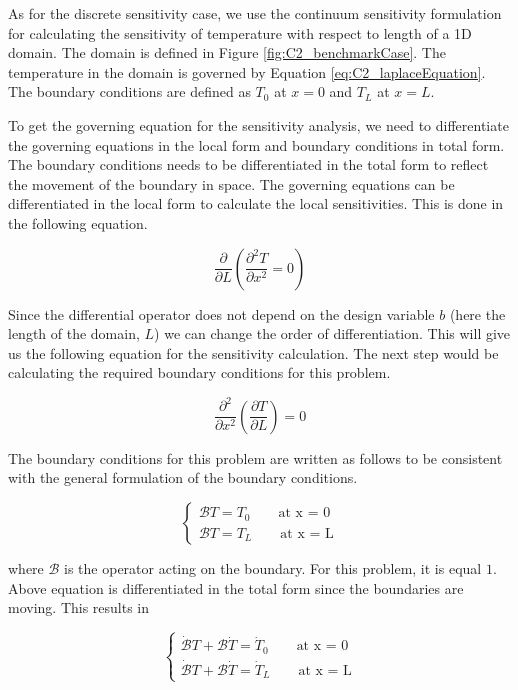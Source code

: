 As for the discrete sensitivity case, we use the continuum sensitivity formulation for calculating the sensitivity of temperature with respect to length of a 1D domain. The domain is defined in Figure \ref{fig:C2_benchmarkCase}. The temperature in the domain is governed by Equation \eqref{eq:C2_laplaceEquation}. The boundary conditions are defined as $T_0$ at $x=0$ and $T_L$ at $x=L$.

To get the governing equation for the sensitivity analysis, we need to differentiate the governing equations in the local form and boundary conditions in total form. The boundary conditions needs to be differentiated in the total form to reflect the movement of the boundary in space. The governing equations can be differentiated in the local form to calculate the local sensitivities. This is done in the following equation.

\begin{equation*}
	\frac{\partial}{\partial L}
	\left( \frac{\partial^2 T}{\partial x^2} = 0 \right)
\end{equation*}

Since the differential operator does not depend on the design variable $b$ (here the length of the domain, $L$) we can change the order of differentiation. This will give us the following equation for the sensitivity calculation. The next step would be calculating the required boundary conditions for this problem.

\begin{equation}\label{eq:C2_laplaceSAequation}
	\frac{\partial^2}{\partial x^2} \left( \frac{\partial T}{\partial L} \right) = 0
\end{equation}

The boundary conditions for this problem are written as follows to be consistent with the general formulation of the boundary conditions. 

\begin{equation*}
\begin{cases}
	\mathcal{B}T = T_0 \qquad \text{at x = 0} \\
	\mathcal{B}T = T_L \qquad \text{at x = L}
\end{cases}
\end{equation*}

where $\mathcal{B}$ is the operator acting on the boundary. For this problem, it is equal $1$. Above equation is differentiated in the total form since the boundaries are moving. This results in

\begin{equation*}
\begin{cases}
	\dot{\mathcal{B}} T + \mathcal{B} \dot{T} = \dot{T}_0 \qquad \text{at x = 0} \\
	\dot{\mathcal{B}} T + \mathcal{B} \dot{T} = \dot{T}_L \qquad \text{at x = L}
\end{cases}
\end{equation*}

